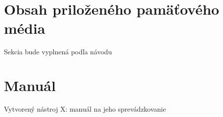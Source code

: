\chapter{Obsah priloženého pamäťového média}

Sekcia bude vyplnená podľa návodu 

\chapter{Manuál}

Vytvorený nástroj X: manuál na jeho sprevádzkovanie
